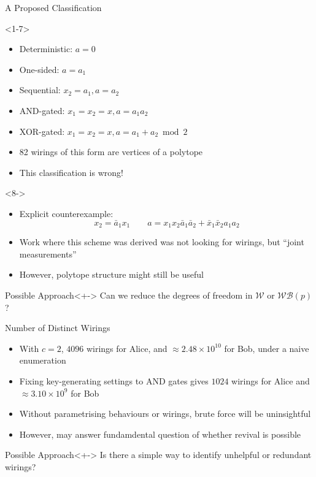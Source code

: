\documentclass[xcolor=dvipsnames]{beamer}
\newcommand{\?}{\mathrel{?}} %
\newcommand{\sW}{\mathcal{W}}
\newcommand{\sWB}{\mathcal{WB}}
\begin{document}
\begin{frame}{A Proposed Classification}
  \begin{onlyenv}<1-7>
    \begin{itemize}[<+->]
      \item Deterministic: \(a = 0\)
      \item One-sided: \(a = a_1\)
      \item Sequential: \(x_2 = a_1, a = a_2\)
      \item AND-gated: \(x_1 = x_2 = x, a = a_1a_2\)
      \item XOR-gated: \(x_1 = x_2 = x, a = a_1 + a_2 \bmod 2\)
      \item 82 wirings of this form are vertices of a polytope
      \item This classification is \alert{wrong}!
    \end{itemize}
  \end{onlyenv}
  \begin{onlyenv}<8->
    \begin{itemize}[<+->]
      \item Explicit counterexample:
        \[ x_2 = \bar{a}_1x_1 \qquad a = x_1x_2\bar{a}_1\bar{a}_2 + \bar{x}_1\bar{x}_2a_1a_2 \]
      \item Work where this scheme was derived was not looking for wirings, but ``joint measurements''
      \item However, polytope structure might still be useful
    \end{itemize}
  \end{onlyenv}
  \begin{block}{Possible Approach}<+->
    Can we reduce the degrees of freedom in \(\sW\) or \(\sWB(p)\)?
  \end{block}
\end{frame}

\begin{frame}{Number of Distinct Wirings}
  \begin{itemize}[<+->]
    \item With \(c=2\), \(4096\) wirings for Alice, and \(\approx 2.48 \times 10^{10}\) for Bob, under a naive enumeration
    \item Fixing key-generating settings to AND gates gives \(1024\) wirings for Alice and \(\approx 3.10 \times 10^{9}\) for Bob
    \item Without parametrising behaviours or wirings, brute force will be uninsightful
    \item However, may answer fundamdental question of whether revival is possible
  \end{itemize}
  \begin{block}{Possible Approach}<+->
    Is there a simple way to identify unhelpful or redundant wirings?
  \end{block}
\end{frame}
\end{document}
